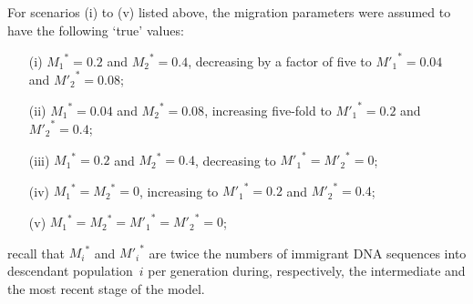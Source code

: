\documentclass[11pt]{article}
\begin{document}
For scenarios (i) to (v) listed above, the migration parameters were assumed to have the following `true' values:
\begin{enumerate}
\item[(i)] ${M_1}^{\!*}=0.2$ and ${M_2}^{\!*}=0.4$, decreasing by a factor of five to ${M'_1}^{*}=0.04$ and ${M'_2}^{*}=0.08$; 
\item[(ii)] ${M_1}^{\!*}=0.04$ and ${M_2}^{\!*}=0.08$, increasing five-fold to ${M'_1}^{*}=0.2$ and ${M'_2}^{*}=0.4$;
\item[(iii)] ${M_1}^{\!*}=0.2$ and ${M_2}^{\!*}=0.4$, decreasing to ${M'_1}^{*}={M'_2}^{*}=0$; 
\item[(iv)] ${M_1}^{\!*}={M_2}^{\!*}=0$, increasing to ${M'_1}^{*}=0.2$ and ${M'_2}^{*}=0.4$;
\item[(v)]  ${M_1}^{\!*}={M_2}^{\!*}={M'_1}^{*}={M'_2}^{*}=0$;
\end{enumerate}
recall that ${M_i}^{\!*}$ and ${M'_i}^{*}$ are twice the numbers of immigrant DNA sequences into descendant population~$i$ per generation during, respectively, the intermediate and the most recent stage of the model.
\end{document}
